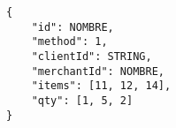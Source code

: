 \begin{lstlisting}
{
	"id": NOMBRE,
	"method": 1,
	"clientId": STRING,
	"merchantId": NOMBRE,
	"items": [11, 12, 14],
	"qty": [1, 5, 2]
}	
\end{lstlisting}
